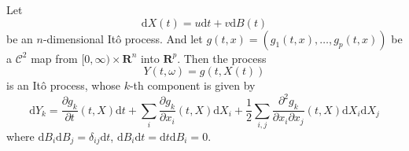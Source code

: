 \begin{theorem}
    Let
    \[
        \mathrm{d}X(t) = u \mathrm{d}t + v \mathrm{d}B(t)
    \]
    be an $n$-dimensional Itô process. And let $g(t,x) = (g_1(t,x), \ldots, g_p(t,x))$ be a $\mathcal{C}^2$ map from $[0, \infty) \times \textbf{R}^n$ into $\textbf{R}^p$. Then the process 
    \[
        Y(t, \omega) = g(t, X(t))
    \]
    is an Itô process, whose $k$-th component is given by 
    \[
        \mathrm{d}Y_k = \frac{\partial g_k}{\partial t}(t, X) \mathrm{d}t + \sum_i \frac{\partial g_k}{\partial x_i}(t, X) \mathrm{d}X_i + \frac{1}{2} \sum_{i,j} \frac{\partial^2 g_k}{\partial x_i \partial x_j} (t,X) \mathrm{d}X_i \mathrm{d}X_j
    \]
    where $\mathrm{d}B_i \mathrm{d}B_j = \delta_{ij}\mathrm{d}t$, $\mathrm{d}B_i \mathrm{d}t = \mathrm{d}t \mathrm{d}B_i = 0$.
\end{theorem}